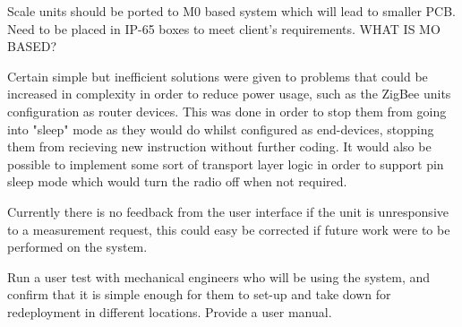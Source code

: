 Scale units should be ported to M0 based system which will lead to smaller PCB. Need to be placed in IP-65 boxes to meet client's requirements.
WHAT IS MO BASED?

Certain simple but inefficient solutions were given to problems that could be increased in complexity in order to reduce power usage, such as the ZigBee units configuration as router devices. This was done in order to stop them from going into "sleep" mode as they would do whilst configured as end-devices, stopping them from recieving new instruction without further coding. It would also be possible to implement some sort of transport layer logic in order to support pin sleep mode which would turn the radio off when not required.

Currently there is no feedback from the user interface if the unit is unresponsive to a measurement request, this could easy be corrected if future work were to be performed on the system. 

Run a user test with mechanical engineers who will be using the system, and confirm that it is simple enough for them to set-up and take down for redeployment in different locations. Provide a user manual.